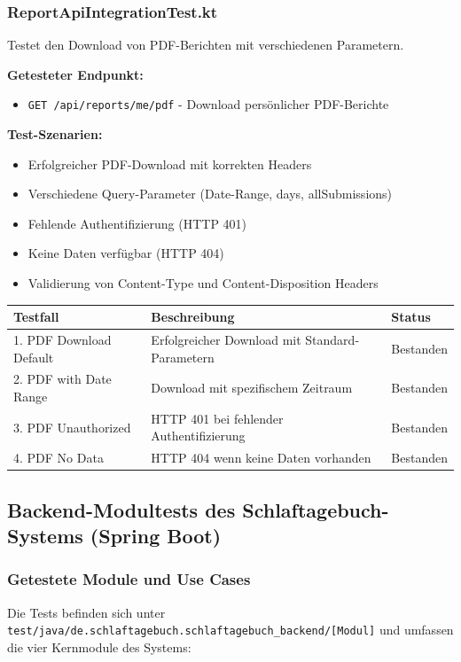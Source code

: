 \subsubsection{ReportApiIntegrationTest.kt}
Testet den Download von PDF-Berichten mit verschiedenen Parametern.

\textbf{Getesteter Endpunkt:}
\begin{itemize}
  \item \texttt{GET /api/reports/me/pdf} - Download persönlicher PDF-Berichte
\end{itemize}

\textbf{Test-Szenarien:}
\begin{itemize}
  \item Erfolgreicher PDF-Download mit korrekten Headers
  \item Verschiedene Query-Parameter (Date-Range, days, allSubmissions)
  \item Fehlende Authentifizierung (HTTP 401)
  \item Keine Daten verfügbar (HTTP 404)
  \item Validierung von Content-Type und Content-Disposition Headers
\end{itemize}

\begin{tabularx}{\textwidth}{|l|X|l|}
\hline
\textbf{Testfall} & \textbf{Beschreibung} & \textbf{Status} \\
\hline
1. PDF Download Default & Erfolgreicher Download mit Standard-Parametern & Bestanden\\
\hline
2. PDF with Date Range & Download mit spezifischem Zeitraum & Bestanden\\
\hline
3. PDF Unauthorized & HTTP 401 bei fehlender Authentifizierung & Bestanden\\
\hline
4. PDF No Data & HTTP 404 wenn keine Daten vorhanden &Bestanden\\
\hline
\end{tabularx}
\subsection{Backend-Modultests des Schlaftagebuch-Systems (Spring Boot)}

\subsubsection{Getestete Module und Use Cases}

Die Tests befinden sich unter \texttt{test/java/de.schlaftagebuch.schlaftagebuch\_backend/[Modul]} und umfassen die vier Kernmodule des Systems:

